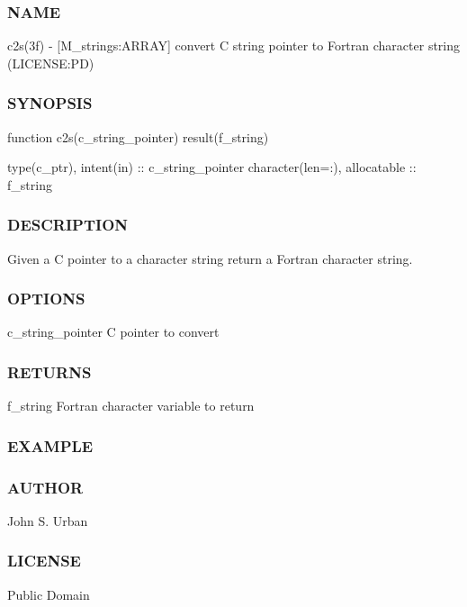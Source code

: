 \subsubsection*{N\+A\+ME}

c2s(3f) -\/ \mbox{[}M\+\_\+strings\+:A\+R\+R\+AY\mbox{]} convert C string pointer to Fortran character string (L\+I\+C\+E\+N\+SE\+:PD) 

\subsubsection*{S\+Y\+N\+O\+P\+S\+IS}

\begin{DoxyVerb}function c2s(c_string_pointer) result(f_string)

 type(c_ptr), intent(in)       :: c_string_pointer
 character(len=:), allocatable :: f_string
\end{DoxyVerb}
 \subsubsection*{D\+E\+S\+C\+R\+I\+P\+T\+I\+ON}

Given a C pointer to a character string return a Fortran character string. \subsubsection*{O\+P\+T\+I\+O\+NS}

c\+\_\+string\+\_\+pointer C pointer to convert \subsubsection*{R\+E\+T\+U\+R\+NS}

f\+\_\+string Fortran character variable to return \subsubsection*{E\+X\+A\+M\+P\+LE}

\subsubsection*{A\+U\+T\+H\+OR}

John S. Urban \subsubsection*{L\+I\+C\+E\+N\+SE}

Public Domain \mbox{\label{namespacem__strings_a1222f3b718f7637105bde330367925e1}} 
